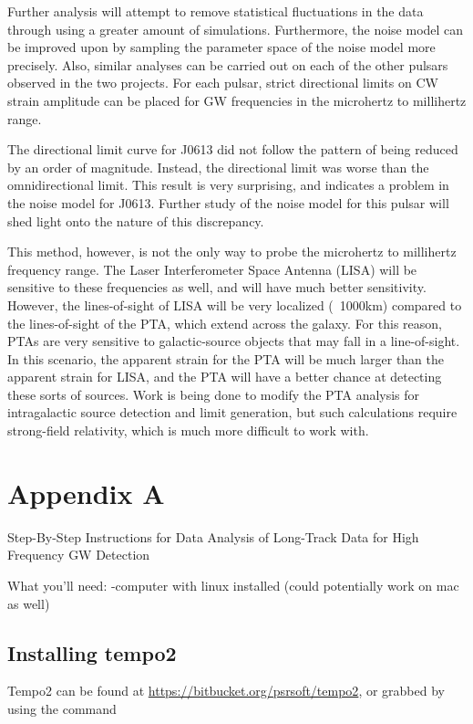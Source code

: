 \documentclass[12pt]{article}
\begin{document}
    Further analysis will attempt to remove statistical fluctuations in the data
through using a greater amount of simulations. Furthermore, the noise model can
be improved upon by sampling the parameter space of the noise model more
precisely. Also, similar analyses can be carried out on each of the other
pulsars observed in the two projects. For
each pulsar, strict directional limits on CW strain amplitude can be placed for
GW frequencies in the microhertz to millihertz range.

The directional limit curve for J0613 did not follow the pattern of being
reduced by an order of magnitude. Instead, the directional limit was worse than
the omnidirectional limit. This result is very surprising, and indicates a
problem in the noise model for J0613. Further study of the noise model for this
pulsar will shed light onto the nature of this discrepancy.

This method, however, is not the only way to probe the microhertz to millihertz
frequency range. The Laser Interferometer Space Antenna (LISA) will be sensitive
to these frequencies as well, and will have much better sensitivity. However,
the lines-of-sight of LISA will be very localized (~1000km) compared to the
lines-of-sight of the PTA, which extend across the galaxy. For this reason, PTAs
are very sensitive to galactic-source objects that may fall in a line-of-sight.
In this scenario, the apparent strain for the PTA will be much larger than the
apparent strain for LISA, and the PTA will have a better chance at detecting
these sorts of sources. Work is being done to modify the PTA analysis for
intragalactic source detection and limit generation, but such calculations
require strong-field relativity, which is much more difficult to work with.

\section*{Appendix A}

Step-By-Step Instructions for Data Analysis of Long-Track Data for High
Frequency GW Detection

What you'll need: -computer with linux installed (could potentially work on mac
as well)

\subsection*{Installing tempo2}

Tempo2 can be found at
\url{https://bitbucket.org/psrsoft/tempo2}, or grabbed by using the command
\end{document}
